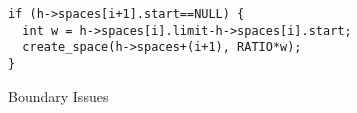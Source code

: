 \begin{figure}[t]
\vspace{-1ex}
  \begin{lstlisting}
if (h->spaces[i+1].start==NULL) {
  int w = h->spaces[i].limit-h->spaces[i].start;
  create_space(h->spaces+(i+1), RATIO*w);
}
\end{lstlisting}

\caption{Boundary Issues}
\label{fig:boundary}
\vspace{-1em}
\end{figure}